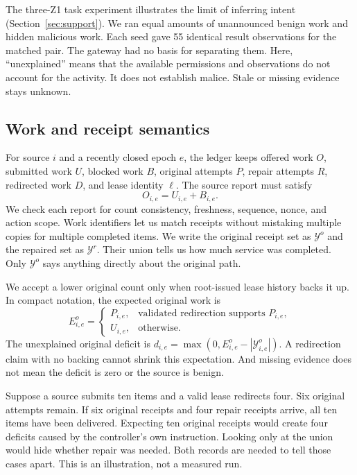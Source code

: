 \documentclass[journal]{IEEEtran}
\begin{document}
The three-Z1 task experiment illustrates the limit of inferring intent (Section~\ref{sec:support}). We ran equal amounts of unannounced benign work and hidden malicious work. Each seed gave 55 identical result observations for the matched pair. The gateway had no basis for separating them. Here, ``unexplained'' means that the available permissions and observations do not account for the activity. It does not establish malice. Stale or missing evidence stays unknown.

\subsection{Work and receipt semantics}
For source $i$ and a recently closed epoch $e$, the ledger keeps offered work $O$, submitted work $U$, blocked work $B$, original attempts $P$, repair attempts $R$, redirected work $D$, and lease identity $\ell$. The source report must satisfy
\begin{equation}
O_{i,e}=U_{i,e}+B_{i,e}.
\end{equation}
We check each report for count consistency, freshness, sequence, nonce, and action scope. Work identifiers let us match receipts without mistaking multiple copies for multiple completed items. We write the original receipt set as $\mathcal{Y}^{o}$ and the repaired set as $\mathcal{Y}^{r}$. Their union tells us how much service was completed. Only $\mathcal{Y}^{o}$ says anything directly about the original path.

We accept a lower original count only when root-issued lease history backs it up. In compact notation, the expected original work is
\begin{equation}
E^{o}_{i,e}=\begin{cases}P_{i,e},&\text{validated redirection supports }P_{i,e},\\ U_{i,e},&\text{otherwise.}\end{cases}
\end{equation}
The unexplained original deficit is $d_{i,e}=\max(0,E^o_{i,e}-|\mathcal{Y}^{o}_{i,e}|)$. A redirection claim with no backing cannot shrink this expectation. And missing evidence does not mean the deficit is zero or the source is benign.

Suppose a source submits ten items and a valid lease redirects four. Six original attempts remain. If six original receipts and four repair receipts arrive, all ten items have been delivered. Expecting ten original receipts would create four deficits caused by the controller's own instruction. Looking only at the union would hide whether repair was needed. Both records are needed to tell those cases apart. This is an illustration, not a measured run.
\end{document}
